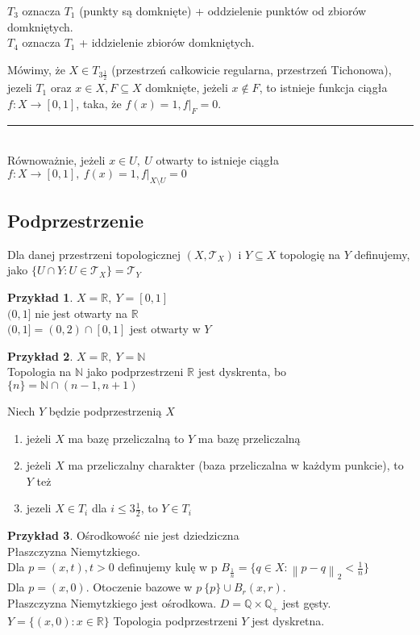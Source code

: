 \documentclass[twoside,10pt]{article}
\newcommand{\norm}[1]{\left\lVert#1\right\rVert}
\theoremstyle{definition}
\theoremstyle{definition}
\theoremstyle{definition}
\theoremstyle{definition}
\theoremstyle{remark}
\theoremstyle{definition}
\theoremstyle{definition}
\theoremstyle{definition}
\theoremstyle{definition}
\newtheorem*{prz}{Przykład}
\theoremstyle{definition}
\theoremstyle{definition}
\begin{document}
$T_3$ oznacza $T_1$ (punkty są domknięte) + oddzielenie punktów od zbiorów domkniętych. \\ 
$T_4$ oznacza $T_1$ + iddzielenie zbiorów domkniętych.
\begin{df} 
    Mówimy, że $X \in T_{3 \frac{1}{2}}$ (przestrzeń całkowicie regularna, przestrzeń Tichonowa), jezeli 
    $T_1$ oraz $x \in X, F \subseteq X$ domknięte, jeżeli $x \notin F$, 
    to istnieje funkcja ciągła $f : X \to [0,1]$, taka, że $f(x) = 1, f|_F = 0$. \\
    \rule{2cm}{0.4pt}\\ 
    Równoważnie, jeżeli $x \in U,\ U$ otwarty to istnieje ciągła $f: X \to [0,1],\ f(x) = 1, f|_{X\setminus U}= 0$
\end{df} 
\subsection{Podprzestrzenie} 
Dla danej przestrzeni topologicznej $(X,\mathcal T_X)$ i $Y \subseteq X$ topologię na $Y$ definujemy, jako 
$\{U \cap Y: U \in \mathcal T_X \} = \mathcal T_Y$
\begin{prz} 
    $X = \mathbb R,\ Y = [0,1]$ \\ 
    $(0,1]$ nie jest otwarty na $\mathbb R$ \\
    $(0,1] = (0,2) \cap [0,1]$ jest otwarty w $Y$
\end{prz} 
\begin{prz}
    $X = \mathbb R,\ Y = \mathbb N$ \\ 
    Topologia na $\mathbb N$ jako podprzestrzeni $\mathbb R$ jest dyskrenta, bo $ \{n\} = \mathbb N \cap (n-1,n+1)$
\end{prz}
\begin{tw} 
    Niech $Y$ będzie podprzestrzenią $X$
    \begin{enumerate}[(1)]
        \item jeżeli $X$ ma bazę przeliczalną to $Y$ ma bazę przeliczalną 
        \item jeżeli $X$ ma przeliczalny charakter (baza przeliczalna w każdym punkcie), to $Y$ też
        \item jezeli $X \in T_i$ dla $i \le 3 \frac{1}{2}$, to $Y \in T_i$
    \end{enumerate} 
\end{tw} 
\begin{prz} Ośrodkowość nie jest dziedziczna \\
    Płaszczyzna Niemytzkiego. \\ 
    Dla $p = (x,t), t > 0$ definujemy kulę w p $B_{\frac{1}{n}} = \{ q \in X : \norm{p-q}_2 < \frac{1}{n} \}$ \\
    Dla $p = (x,0)$. Otoczenie bazowe w $p \ \{p\} \cup B_r (x,r)$. \\ 
    Płaszczyzna Niemytzkiego jest ośrodkowa. $D = \mathbb Q \times \mathbb Q_+$ jest gęsty. \\
    $Y = \{ (x,0) : x \in \mathbb R\}$ Topologia podprzestrzeni $Y$ jest dyskretna.
\end{prz} 
\end{document}
